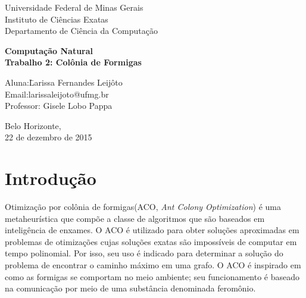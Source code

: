 \documentclass[a4paper, 12pt]{article}
\begin{document}
\onehalfspace
\begin{titlepage}
	\begin{center}
		\large{Universidade Federal de Minas Gerais\\
			Instituto de Ciências Exatas\\
			Departamento de Ciência da Computação\\
		}

\vspace{70pt}

      
        \vspace{85pt}
        
		\textbf{\huge{Computação Natural\\}}
		\large{\textbf{Trabalho 2:
        		Colônia de Formigas}}
		\vspace{160pt}
		
	\end{center}
	
	\begin{flushleft}
		\begin{tabbing}
			Aluna:\qquad\qquad\= Larissa Fernandes Leijôto\\
			Email:\qquad\qquad larissaleijoto@ufmg.br\\
			Professor:\> Gisele Lobo Pappa\\
		
	\end{tabbing}
		  
	\end{flushleft}
	
	\begin{center}
		\vspace{\fill}
		Belo Horizonte, \\22 de dezembro de 2015
	\end{center}
\end{titlepage}
\newpage
\tableofcontents
\thispagestyle{empty}

\newpage
{}

\section{Introdução}
Otimização por colônia de formigas(ACO, \textit{Ant Colony Optimization}) é uma metaheurística que compõe a classe de algoritmos que são baseados em inteligência de enxames. O ACO é utilizado para obter soluções aproximadas em problemas de otimizações cujas soluções exatas são impossíveis de computar em tempo polinomial. Por isso, seu uso é indicado para determinar a solução do problema de encontrar o caminho máximo em uma grafo. O ACO é inspirado em como as formigas se comportam no meio ambiente; seu funcionamento é baseado na comunicação por meio de uma substância denominada feromônio.
\end{document}
